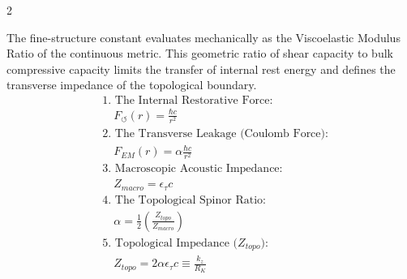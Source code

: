 \begin{multicols}{2}
\begin{tcolorbox}[cheatbox, title={\refstepcounter{cheatnum}\label{box:fine_structure2}\thecheatnum. The Viscoelastic Modulus Ratio ($\alpha$) \& Topological Impedance \hfill\makebox[0pt][r]{\scriptsize\hyperref[sec:deriv_fine_structure2]{[Proof $\downarrow$]}}}]
The fine-structure constant evaluates mechanically as the Viscoelastic Modulus Ratio of the continuous metric. This geometric ratio of shear capacity to bulk compressive capacity limits the transfer of internal rest energy and defines the transverse impedance of the topological boundary.
\begin{align}
    &\text{1. The Internal Restorative Force:} \nonumber \\
    &\quad F_{\circlearrowleft}(r) = \frac{\hbar c}{r^2} \label{eq:internal_rotational_force} \\
    &\text{2. The Transverse Leakage (Coulomb Force):} \nonumber \\
    &\quad F_{EM}(r) = \alpha \frac{\hbar c}{r^2} \label{eq:electromagnetic_leakage} \\
    &\text{3. Macroscopic Acoustic Impedance:} \nonumber \\
    &\quad Z_{macro} = \epsilon_{\tau} c  \label{eq:macroscopic_impedance} \\
    &\text{4. The Topological Spinor Ratio:} \nonumber \\
    &\quad \alpha = \frac{1}{2} \left( \frac{Z_{topo}}{Z_{macro}} \right) \label{eq:tensor_coupling_derivation} \\
    &\text{5. Topological Impedance ($Z_{topo}$):} \nonumber \\
    &\quad Z_{topo} = 2 \alpha \epsilon_{\tau} c \equiv \frac{k_z}{R_K} \label{eq:topological_impedance}
\end{align}
\end{tcolorbox}




\end{multicols}

